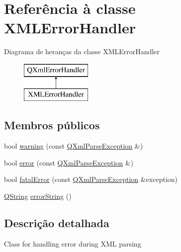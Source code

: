 \hypertarget{class_x_m_l_error_handler}{\section{Referência à classe X\-M\-L\-Error\-Handler}
\label{class_x_m_l_error_handler}
}
Diagrama de heranças da classe X\-M\-L\-Error\-Handler\begin{figure}[H]
\begin{center}
\leavevmode
\includegraphics[height=2.000000cm]{class_x_m_l_error_handler}
\end{center}
\end{figure}
\subsection*{Membros públicos}
\begin{DoxyCompactItemize}
\item 
bool \hyperlink{class_x_m_l_error_handler_aac28fc998851e69a512e4f544eeff5a7}{warning} (const \hyperlink{class_q_xml_parse_exception}{Q\-Xml\-Parse\-Exception} \&)
\item 
bool \hyperlink{class_x_m_l_error_handler_abb2a084eeba80972cfe5bd3804b2f0bd}{error} (const \hyperlink{class_q_xml_parse_exception}{Q\-Xml\-Parse\-Exception} \&)
\item 
bool \hyperlink{class_x_m_l_error_handler_afe3fbf09765011104e0d12ee0d395619}{fatal\-Error} (const \hyperlink{class_q_xml_parse_exception}{Q\-Xml\-Parse\-Exception} \&exception)
\item 
\hyperlink{class_q_string}{Q\-String} \hyperlink{class_x_m_l_error_handler_af799a7684337babb971e2e0d8cda7cf1}{error\-String} ()
\end{DoxyCompactItemize}


\subsection{Descrição detalhada}
Class for handling error during X\-M\-L parsing 

